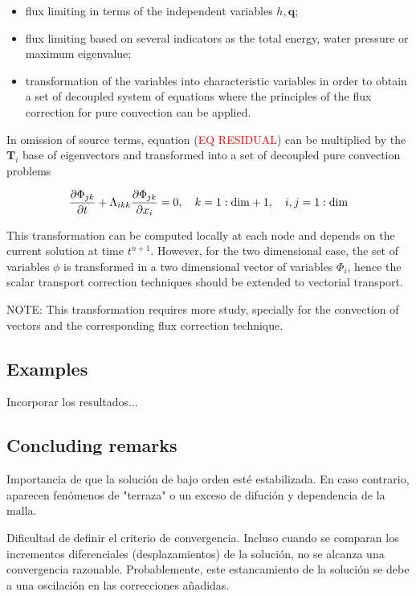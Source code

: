 \begin{itemize}
    \item flux limiting in terms of the independent variables $h, \mathbf{q}$;
    \item flux limiting based on several indicators as the total energy, water pressure or maximum eigenvalue;
    \item transformation of the variables into characteristic variables in order to obtain a set of decoupled system of equations where the principles of the flux correction for pure convection can be applied.
\end{itemize}

In omission of source terms, equation (\textcolor{red}{EQ RESIDUAL}) can be multiplied by the $\mathbf{T}_i$ base of eigenvectors and transformed into a set of decoupled pure convection problems

\begin{equation}
\frac{\partial\Phi_{jk}}{\partial t} + \Lambda_{ikk} \frac{\partial\Phi_{jk}}{\partial x_i} = 0 , \quad
k = 1:\text{dim}+1 , \quad
i,j = 1:\text{dim}
\end{equation}

This transformation can be computed locally at each node and depends on the current solution at time $t^{n+1}$. However, for the two dimensional case, the set of variables $\phi$ is transformed in a two dimensional vector of variables $\Phi_i$, hence the scalar transport correction techniques should be extended to vectorial transport.



NOTE: This transformation requires more study, specially for the convection of vectors and the corresponding flux correction technique.


\subsection{Examples}

Incorporar los resultados...


\subsection{Concluding remarks}

Importancia de que la solución de bajo orden esté estabilizada. En caso contrario, aparecen fenómenos de "terraza" o un exceso de difución y dependencia de la malla.

Dificultad de definir el criterio de convergencia. Incluso cuando se comparan los incrementos diferenciales (desplazamientos) de la solución, no se alcanza una convergencia razonable. Probablemente, este estancamiento de la solución se debe a una oscilación en las correcciones añadidas.

